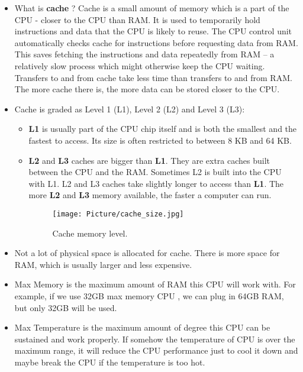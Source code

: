 \documentclass[a4paper]{article}
\begin{document}
\begin{itemize}
    \item[]What is \textbf{cache} ? Cache is a small amount of memory which is a part of the CPU - closer to the CPU than RAM. It is used to temporarily hold instructions and data that the CPU is likely to reuse. The CPU control unit automatically checks cache for instructions before requesting data from RAM. This saves fetching the instructions and data repeatedly from RAM – a relatively slow process which might otherwise keep the CPU waiting. Transfers to and from cache take less time than transfers to and from RAM. The more cache there is, the more data can be stored closer to the CPU.

    
    \item[]Cache is graded as Level 1 (L1), Level 2 (L2) and Level 3 (L3):
    \begin{itemize}
    
        \item \textbf{L1} is usually part of the CPU chip itself and is both the smallest and the fastest to access. Its size is often restricted to between 8 KB and 64 KB.
    
        \item \textbf{L2} and \textbf{L3} caches are bigger than \textbf{L1}. They are extra caches built between the CPU and the RAM. Sometimes L2 is built into the CPU with L1. L2 and L3 caches take slightly longer to access than \textbf{L1}. The more \textbf{L2} and \textbf{L3} memory available, the faster a computer can run.
    
        \begin{figure}[H]
            \centering
            \texttt{[image: Picture/cache\_size.jpg]}
            \caption{Cache memory level.}
            \label{2.1}
        \end{figure}
    \end{itemize}
    
    \item[]Not a lot of physical space is allocated for cache. There is more space for RAM, which is usually larger and less expensive.

    \item[]Max Memory is the maximum amount of RAM this CPU will work with. For example, if we use 32GB max memory CPU , we can plug in 64GB RAM, but only 32GB will be used.

    \item[]Max Temperature is the maximum amount of degree this CPU can be sustained and work properly. If somehow the temperature of CPU is over the maximum range, it will reduce the CPU performance just to cool it down and maybe break the CPU if the temperature is too hot. 
\end{itemize}
\end{document}
